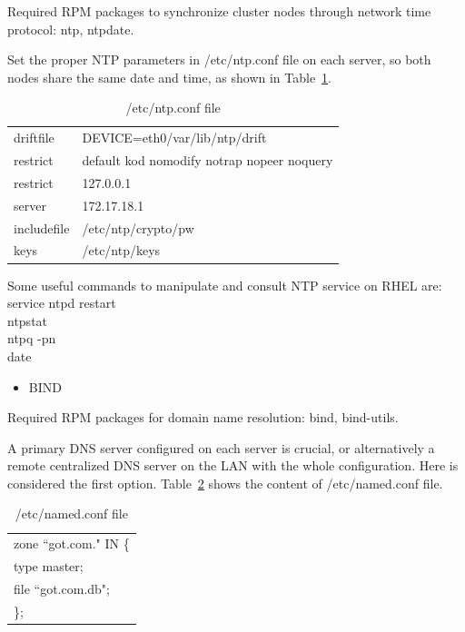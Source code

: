 \documentclass[a4paper, 12pt]{book}
\begin{document}
\noindent Required RPM packages to synchronize cluster nodes through network time protocol: ntp, ntpdate.\bigskip

\noindent Set the proper NTP parameters in /etc/ntp.conf file on each server, so both nodes share the same date and time, as shown in Table~\ref{table:ntp}.

\FloatBarrier
\begin{table}[H]
  \centering
  \begin{tabular}{ | l l | }
    \hline
    driftfile & DEVICE=eth0/var/lib/ntp/drift \\
	restrict & default kod nomodify notrap nopeer noquery \\
    restrict & 127.0.0.1 \\
    server & 172.17.18.1 \\
    includefile & /etc/ntp/crypto/pw \\
    keys & /etc/ntp/keys \\
    \hline
  \end{tabular}
\caption{/etc/ntp.conf file}
\label{table:ntp}
\end{table}


\noindent Some useful commands to manipulate and consult NTP service on RHEL are:\\
\indent service ntpd restart \\
\indent ntpstat \\
\indent ntpq -pn \\
\indent date

\begin{itemize}[leftmargin=*]
	\item BIND
\end{itemize}

\noindent Required RPM packages for domain name resolution: bind, bind-utils.\bigskip

\noindent A primary DNS server configured on each server is crucial, or alternatively a remote centralized DNS server on the LAN with the whole configuration. Here is considered the first option. Table~\ref{table:named} shows the content of /etc/named.conf file.

\FloatBarrier
\begin{table}[H]
  \centering
  \begin{tabular}{ | l | }
    \hline
	  zone ``got.com." IN \{ \\
       type master; \\
       file ``got.com.db"; \\
       \}; \\
    \hline
  \end{tabular}
\caption{/etc/named.conf file}
\label{table:named}
\end{table}
\end{document}
